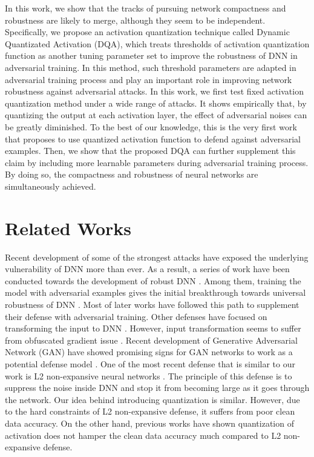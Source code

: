\documentclass{article}
\begin{document}
In this work, we show that the tracks of pursuing network compactness and robustness are likely to merge, although they seem to be independent. Specifically, we propose an activation quantization technique called Dynamic Quantizated Activation (DQA), which treats thresholds of activation quantization function as another tuning parameter set to improve the robustness of DNN in adversarial training. In this method, such threshold parameters are adapted in adversarial training process and play an important role in improving network robustness against adversarial attacks. In this work, we first test fixed activation quantization method under a wide range of attacks. It shows empirically that, by quantizing the output at each activation layer, the effect of adversarial noises can be greatly diminished. To the best of our knowledge, this is the very first work that proposes to use quantized activation function to defend against adversarial examples. Then, we show that the proposed DQA can further supplement this claim by including more learnable parameters during adversarial training process. By doing so, the compactness and robustness of neural networks are simultaneously achieved.

\section{Related Works}

Recent development of some of the strongest \cite{madry2017towards,carlini2017towards,athalye2018obfuscated,chen2017zoo} attacks have exposed the underlying vulnerability of DNN more than ever. As a result, a series of work have been conducted towards the development of robust DNN \cite{samangouei2018defense,papernot2016transferability,madry2017towards,qian2018l2,santhanam2018defending,xie2017mitigating,guo2017countering,tramer2017ensemble,raghunathan2018certified,dhillon2018stochastic,prakash2018deflecting}. Among them, training the model with adversarial examples gives the initial breakthrough towards universal robustness of DNN \cite{madry2017towards}. Most of later works have followed this path to supplement their defense with adversarial training. Other defenses have focused on transforming the input to DNN \cite{buckman2018thermometer,guo2017countering}. However, input transformation seems to suffer from obfuscated gradient issue \cite{athalye2018obfuscated}. Recent development of Generative Adversarial Network (GAN) have showed promising signs for GAN networks to work as a potential defense model \cite{santhanam2018defending,samangouei2018defense}. One of the most recent defense that is similar to our work is L2 non-expansive neural networks \cite{qian2018l2}. The principle of this defense is to suppress the noise inside DNN and stop it from becoming large as it goes through the network. Our idea behind introducing quantization is similar. However, due to the hard constraints of L2 non-expansive defense, it suffers from poor clean data accuracy. On the other hand, previous works have shown quantization of activation does not hamper the clean data accuracy much \cite{zhou2016dorefa} compared to L2 non-expansive defense.
\end{document}
